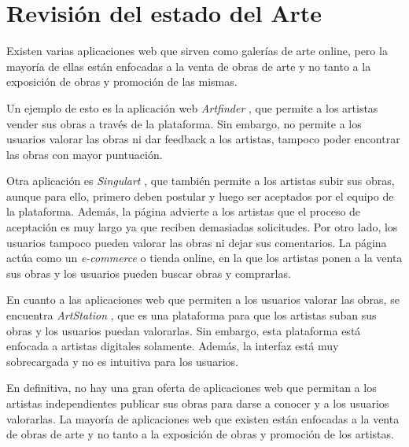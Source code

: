 \section{Revisión del estado del Arte}

Existen varias aplicaciones web que sirven como galerías de arte online, pero la mayoría
de ellas están enfocadas a la venta de obras de arte y no tanto a la exposición de obras
y promoción de las mismas.

Un ejemplo de esto es la aplicación web \textit{Artfinder} \cite{artfinder}, que permite
a los artistas vender sus obras a través de la plataforma. Sin embargo, no permite a los
usuarios valorar las obras ni dar feedback a los artistas, tampoco poder encontrar las obras
con mayor puntuación.

Otra aplicación es \textit{Singulart} \cite{singulart}, que también permite a los artistas
subir sus obras, aunque para ello, primero deben postular y luego ser aceptados por el equipo
de la plataforma. Además, la página advierte a los artistas que el proceso de aceptación
es muy largo ya que reciben demasiadas solicitudes. Por otro lado, los usuarios tampoco
pueden valorar las obras ni dejar sus comentarios. La página actúa como un \textit{e-commerce}
o tienda online, en la que los artistas ponen a la venta sus obras y los usuarios pueden
buscar obras y comprarlas.

En cuanto a las aplicaciones web que permiten a los usuarios valorar las obras, se encuentra
\textit{ArtStation} \cite{artstation}, que es una plataforma para que los artistas suban
sus obras y los usuarios puedan valorarlas. Sin embargo, esta plataforma está enfocada
a artistas digitales solamente. Además, la interfaz está muy sobrecargada y no es intuitiva
para los usuarios.

En definitiva, no hay una gran oferta de aplicaciones web que permitan a los artistas
independientes publicar sus obras para darse a conocer y a los usuarios valorarlas. La
mayoría de aplicaciones web que existen están enfocadas a la venta de obras de arte y no
tanto a la exposición de obras y promoción de los artistas.